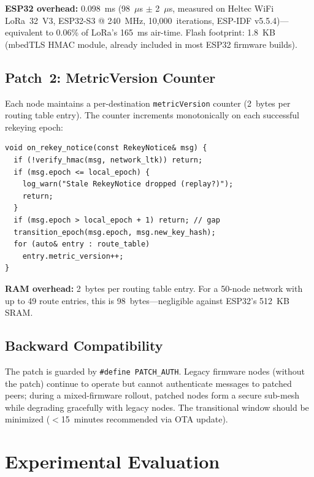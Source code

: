 \documentclass[10pt,journal,compsoc]{IEEEtran}
\begin{document}
\textbf{ESP32 overhead:} 0.098~ms (98~$\mu$s $\pm$ 2~$\mu$s,
measured on Heltec WiFi LoRa~32~V3, ESP32-S3 @ 240~MHz,
10,000~iterations, ESP-IDF v5.5.4)—equivalent to
0.06\% of LoRa's 165~ms air-time. Flash footprint: 1.8~KB (mbedTLS
HMAC module, already included in most ESP32 firmware builds).

\subsection{Patch~2: MetricVersion Counter}

Each node maintains a per-destination \texttt{metricVersion}
counter (2~bytes per routing table entry). The counter increments
monotonically on each successful rekeying epoch:

\begin{lstlisting}[caption={rekeying.cpp — MetricVersion check (18 lines)}]
void on_rekey_notice(const RekeyNotice& msg) {
  if (!verify_hmac(msg, network_ltk)) return;
  if (msg.epoch <= local_epoch) {
    log_warn("Stale RekeyNotice dropped (replay?)");
    return;
  }
  if (msg.epoch > local_epoch + 1) return; // gap
  transition_epoch(msg.epoch, msg.new_key_hash);
  for (auto& entry : route_table)
    entry.metric_version++;
}
\end{lstlisting}

\textbf{RAM overhead:} 2~bytes per routing table entry.
For a 50-node network with up to 49 route entries, this is
98~bytes—negligible against ESP32's 512~KB SRAM.

\subsection{Backward Compatibility}

The patch is guarded by \texttt{\#define PATCH\_AUTH}.
Legacy firmware nodes (without the patch) continue to operate
but cannot authenticate messages to patched peers; during a
mixed-firmware rollout, patched nodes form a secure sub-mesh
while degrading gracefully with legacy nodes. The
transitional window should be minimized ($<$15~minutes
recommended via OTA update).

\section{Experimental Evaluation}
\label{sec:eval}
\end{document}
